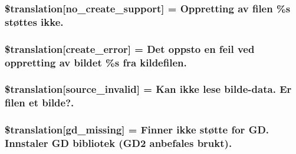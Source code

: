 \subsubsection[{\$translation}]{\setlength{\rightskip}{0pt plus 5cm}\$translation\mbox{[}\textquotesingle{}no\+\_\+create\+\_\+support\textquotesingle{}\mbox{]} = \textquotesingle{}Oppretting av filen \%s støttes ikke.\textquotesingle{}}\label{class_8upload_8no___n_o_8php_a346dfd1ade29f583dd20d345c436859f}
\hypertarget{class_8upload_8no___n_o_8php_a53013ce9255c4e1849098ddd9fdb2b3f}{}
\subsubsection[{\$translation}]{\setlength{\rightskip}{0pt plus 5cm}\$translation\mbox{[}\textquotesingle{}create\+\_\+error\textquotesingle{}\mbox{]} = \textquotesingle{}Det oppsto en feil ved oppretting av bildet \%s fra kildefilen.\textquotesingle{}}\label{class_8upload_8no___n_o_8php_a53013ce9255c4e1849098ddd9fdb2b3f}
\hypertarget{class_8upload_8no___n_o_8php_a6ab0a660b457eaf2d3434b225449fdd6}{}
\subsubsection[{\$translation}]{\setlength{\rightskip}{0pt plus 5cm}\$translation\mbox{[}\textquotesingle{}source\+\_\+invalid\textquotesingle{}\mbox{]} = \textquotesingle{}Kan ikke lese bilde-\/data. Er filen et bilde?.\textquotesingle{}}\label{class_8upload_8no___n_o_8php_a6ab0a660b457eaf2d3434b225449fdd6}
\hypertarget{class_8upload_8no___n_o_8php_a7f3dfcc0db4bbc0f2e7210c439798e56}{}
\subsubsection[{\$translation}]{\setlength{\rightskip}{0pt plus 5cm}\$translation\mbox{[}\textquotesingle{}gd\+\_\+missing\textquotesingle{}\mbox{]} = \textquotesingle{}Finner ikke støtte for G\+D. Innstaler G\+D bibliotek (G\+D2 anbefales brukt).\textquotesingle{}}\label{class_8upload_8no___n_o_8php_a7f3dfcc0db4bbc0f2e7210c439798e56}
\hypertarget{class_8upload_8no___n_o_8php_a82d5853430ab72dc1f9799ec36144cc6}{}
